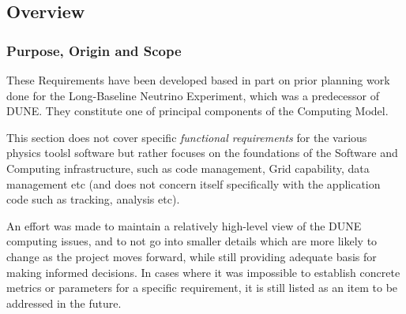 \subsection{Overview}
\subsubsection{Purpose, Origin and Scope}

These Requirements have been developed based in part on prior planning work done for the Long-Baseline Neutrino Experiment, which was a predecessor of DUNE.
They constitute one of principal components of the Computing Model. 

This section does not cover specific \textit{functional requirements} for the various physics toolsl software
but rather focuses on the foundations of the Software and Computing infrastructure, such as code management, Grid capability, data management etc
(and does not concern itself specifically with the application code such as tracking, analysis etc).

An effort was made to maintain a relatively high-level view of the DUNE computing issues, and to not go into smaller details which are more likely to change as the project moves forward, while still providing adequate basis for making informed decisions. In cases where it was impossible to establish concrete metrics or parameters for a specific requirement, it is still listed as an item
to be addressed in the future.



